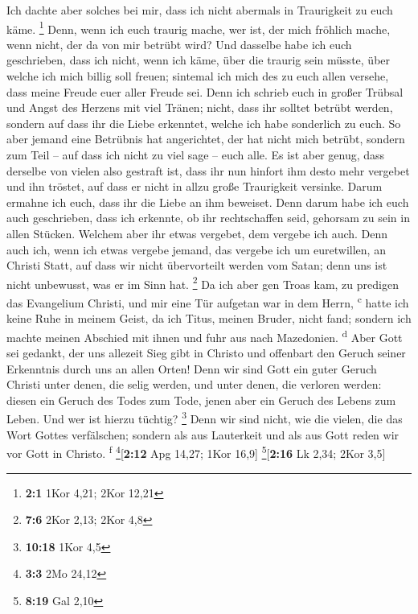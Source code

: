  Ich dachte aber solches bei mir, dass ich nicht abermals
in Traurigkeit zu euch käme. \footnote{\textbf{2:1} 1Kor 4,21; 2Kor
  12,21}  Denn, wenn ich euch traurig mache, wer ist, der
mich fröhlich mache, wenn nicht, der da von mir betrübt wird?
 Und dasselbe habe ich euch geschrieben, dass ich nicht,
wenn ich käme, über die traurig sein müsste, über welche ich mich billig
soll freuen; sintemal ich mich des zu euch allen versehe, dass meine
Freude euer aller Freude sei.  Denn ich schrieb euch in
großer Trübsal und Angst des Herzens mit viel Tränen; nicht, dass ihr
solltet betrübt werden, sondern auf dass ihr die Liebe erkenntet, welche
ich habe sonderlich zu euch.  So aber jemand eine
Betrübnis hat angerichtet, der hat nicht mich betrübt, sondern zum Teil
-- auf dass ich nicht zu viel sage -- euch alle.  Es ist
aber genug, dass derselbe von vielen also gestraft ist, 
dass ihr nun hinfort ihm desto mehr vergebet und ihn tröstet, auf dass
er nicht in allzu große Traurigkeit versinke.  Darum
ermahne ich euch, dass ihr die Liebe an ihm beweiset. 
Denn darum habe ich euch auch geschrieben, dass ich erkennte, ob ihr
rechtschaffen seid, gehorsam zu sein in allen Stücken. 
Welchem aber ihr etwas vergebet, dem vergebe ich auch. Denn auch ich,
wenn ich etwas vergebe jemand, das vergebe ich um euretwillen, an
Christi Statt,  auf dass wir nicht übervorteilt werden
vom Satan; denn uns ist nicht unbewusst, was er im Sinn hat. \footnote{\textbf{7:6}
  2Kor 2,13; 2Kor 4,8}  Da ich aber gen Troas kam, zu
predigen das Evangelium Christi, und mir eine Tür aufgetan war in dem
Herrn, \textsuperscript{c}  hatte ich keine Ruhe in
meinem Geist, da ich Titus, meinen Bruder, nicht fand; sondern ich
machte meinen Abschied mit ihnen und fuhr aus nach Mazedonien.
\textsuperscript{d}  Aber Gott sei gedankt, der uns
allezeit Sieg gibt in Christo und offenbart den Geruch seiner Erkenntnis
durch uns an allen Orten!  Denn wir sind Gott ein guter
Geruch Christi unter denen, die selig werden, und unter denen, die
verloren werden:  diesen ein Geruch des Todes zum Tode,
jenen aber ein Geruch des Lebens zum Leben. Und wer ist hierzu tüchtig?
\footnote{\textbf{10:18} 1Kor 4,5}  Denn wir sind nicht,
wie die vielen, die das Wort Gottes verfälschen; sondern als aus
Lauterkeit und als aus Gott reden wir vor Gott in Christo.
\textsuperscript{f} \footnote{\textbf{3:3} 2Mo 24,12}{[}\textbf{2:12}
Apg 14,27; 1Kor 16,9{]} \footnote{\textbf{8:19} Gal 2,10}{[}\textbf{2:16}
Lk 2,34; 2Kor 3,5{]}

